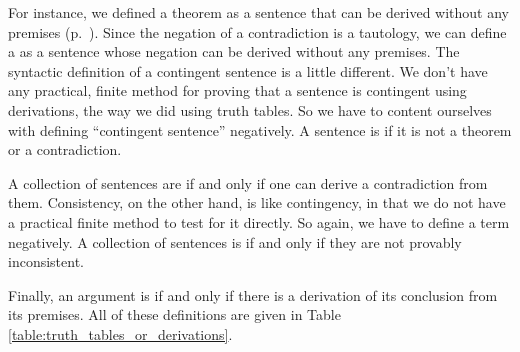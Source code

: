 For instance, we defined a theorem as a sentence that can be derived without any premises (p.~\pageref{def:syntactic_tautology_in_sl}). Since the negation of a contradiction is a tautology, we can define a  \label{def:syntactic_contradiction_in_sl} as a sentence whose negation can be derived without any premises. The syntactic definition of a contingent sentence is a little different. We don't have any practical, finite method for proving that a sentence is contingent using derivations, the way we did using truth tables. So we have to content ourselves with defining ``contingent sentence'' negatively. A sentence is  \label{def:syntactically_contingent_in_sl} if it is not a theorem or a contradiction. 
 

A collection of sentences are  \label{def:syntactically_inconsistent_ in_sl} if and only if one can derive a contradiction from them. Consistency, on the other hand, is like contingency, in that we do not have a practical finite method to test for it directly. So again, we have to define a term negatively. A collection of  sentences is  \label{def:syntactically consistent in SL} if and only if they are not provably inconsistent.
    

Finally, an argument is  \label{def:syntactically_valid_in_SL} if and only if there is a derivation of its conclusion from its premises. All of these definitions are given in Table \ref{table:truth_tables_or_derivations}.


